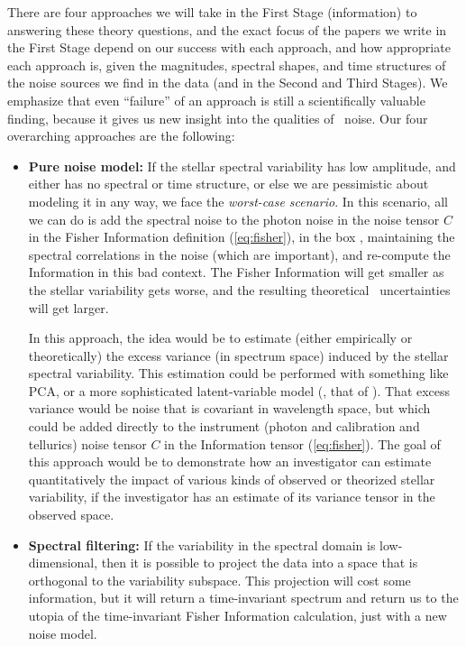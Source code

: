 \documentclass[12pt, letterpaper]{article}
\begin{document}
There are four approaches we will take in the First Stage (information)
to answering these theory questions,
and the exact focus of the papers we write in the First Stage 
depend on our success with each
approach, and how appropriate each approach is, given the magnitudes, spectral
shapes, and time structures of the noise sources we find in the data (and in
the Second and Third Stages). 
We emphasize that even ``failure'' of an approach is still a scientifically 
valuable finding, because it gives us new insight into the qualities 
of \EPRV\ noise. 
Our four overarching approaches are the following:
\begin{itemize}
\item
\textbf{Pure noise model:}
If the stellar spectral variability has low amplitude, and either has
no spectral or time structure, or else we are pessimistic about
modeling it in any way, we face the \emph{worst-case scenario}.
In this scenario, all we can do is add the spectral noise to the photon noise
in the noise tensor $C$ in the Fisher Information definition (\ref{eq:fisher}),
in the box ,
maintaining the spectral correlations in the noise (which are important),
and re-compute the Information in this bad context.
The Fisher Information will get smaller as the stellar variability
gets worse, and the resulting theoretical \EPRV\ uncertainties will
get larger.

In this approach, the idea would be to estimate (either empirically or
theoretically) the excess variance (in spectrum space) induced by the stellar
spectral variability.
This estimation could be performed with something like PCA, or a more
sophisticated latent-variable model (\eg, that of \citealt{HMF}).
That excess variance would be noise that is covariant in wavelength space,
but which could be added directly to the instrument (photon and calibration
and tellurics) noise tensor $C$ in the Information tensor (\ref{eq:fisher}).
The goal of this approach would be to demonstrate how an investigator
can estimate quantitatively the impact of various kinds of observed or
theorized stellar variability, if the investigator has an estimate of
its variance tensor in the observed space.
\item
\textbf{Spectral filtering:}
If the variability in the spectral domain is low-dimensional, then it is
possible to project the data into a space that is orthogonal to the
variability subspace.
This projection will cost some information, but it will return a time-invariant
spectrum and return us to the utopia of the time-invariant Fisher Information
calculation, just with a new noise model.


\end{itemize}
\end{document}
